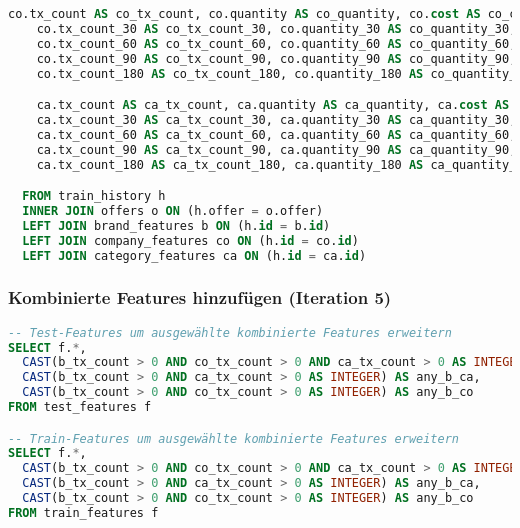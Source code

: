 \begin{lstlisting}[language=SQL]
    co.tx_count AS co_tx_count, co.quantity AS co_quantity, co.cost AS co_cost,
    co.tx_count_30 AS co_tx_count_30, co.quantity_30 AS co_quantity_30, co.cost_30 AS co_cost_30,
    co.tx_count_60 AS co_tx_count_60, co.quantity_60 AS co_quantity_60, co.cost_60 AS co_cost_60,
    co.tx_count_90 AS co_tx_count_90, co.quantity_90 AS co_quantity_90, co.cost_90 AS co_cost_90,
    co.tx_count_180 AS co_tx_count_180, co.quantity_180 AS co_quantity_180, co.cost_180 AS co_cost_180,

    ca.tx_count AS ca_tx_count, ca.quantity AS ca_quantity, ca.cost AS ca_cost,
    ca.tx_count_30 AS ca_tx_count_30, ca.quantity_30 AS ca_quantity_30, ca.cost_30 AS ca_cost_30,
    ca.tx_count_60 AS ca_tx_count_60, ca.quantity_60 AS ca_quantity_60, ca.cost_60 AS ca_cost_60,
    ca.tx_count_90 AS ca_tx_count_90, ca.quantity_90 AS ca_quantity_90, ca.cost_90 AS ca_cost_90,
    ca.tx_count_180 AS ca_tx_count_180, ca.quantity_180 AS ca_quantity_180, ca.cost_180 AS ca_cost_180

  FROM train_history h
  INNER JOIN offers o ON (h.offer = o.offer)
  LEFT JOIN brand_features b ON (h.id = b.id)
  LEFT JOIN company_features co ON (h.id = co.id)
  LEFT JOIN category_features ca ON (h.id = ca.id)
\end{lstlisting}

\subsubsection{Kombinierte Features hinzufügen (Iteration 5)}

\begin{lstlisting}[language=SQL]
-- Test-Features um ausgewählte kombinierte Features erweitern
SELECT f.*, 
  CAST(b_tx_count > 0 AND co_tx_count > 0 AND ca_tx_count > 0 AS INTEGER) AS any_b_co_ca,
  CAST(b_tx_count > 0 AND ca_tx_count > 0 AS INTEGER) AS any_b_ca,
  CAST(b_tx_count > 0 AND co_tx_count > 0 AS INTEGER) AS any_b_co
FROM test_features f

-- Train-Features um ausgewählte kombinierte Features erweitern
SELECT f.*, 
  CAST(b_tx_count > 0 AND co_tx_count > 0 AND ca_tx_count > 0 AS INTEGER) AS any_b_co_ca,
  CAST(b_tx_count > 0 AND ca_tx_count > 0 AS INTEGER) AS any_b_ca,
  CAST(b_tx_count > 0 AND co_tx_count > 0 AS INTEGER) AS any_b_co
FROM train_features f
\end{lstlisting}

